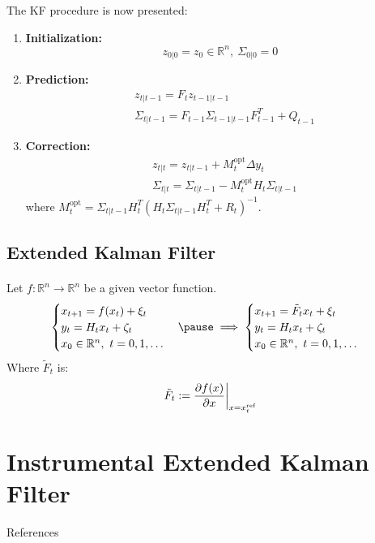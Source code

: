 \documentclass{beamer}
\theoremstyle{definition}
\theoremstyle{remark}
\theoremstyle{example}
\newif\ifinsection
\newif\ifinsubsection
\let\oldsection\section
\renewcommand{\section}{%
  \global\insectiontrue%
  \global\insubsectionfalse%
  \oldsection}
\let\oldsubsection\subsection
\renewcommand{\subsection}{%
  \global\insubsectiontrue%
  \oldsubsection}
\newcommand {\aframe}[1] {%
  \begin{frame}
    \ifinsection\frametitle{\secname}\fi
    \ifinsubsection\framesubtitle{\subsecname}\fi
  #1
  \end{frame}
}
\begin{document}
\aframe{
The KF procedure is now presented:
\begin{enumerate}
  \item \textbf{Initialization: }
  \[
  z_{0|0}=z_0\in \mathbb{R}^n, \ \Sigma_{0|0}=0
  \]
  \item \textbf{Prediction: }
  \[
  \begin{split}
    &z_{t|t-1}=F_tz_{t-1|t-1}\\
    &\Sigma_{t|t-1}=F_{t-1}\Sigma_{t-1|t-1}F_{t-1}^T+Q_{t-1}
  \end{split}
  \]
  \item \textbf{Correction: }
  \[
  \begin{split}
    &z_{t | t}=z_{t | t-1}+M_{t}^{\text{opt}} \Delta y_{t} \\
    &\Sigma_{t | t}=\Sigma_{t | t-1}-M_{t}^{\text{opt}} H_{t} \Sigma_{t | t-1}
  \end{split}
  \]
  where ${M_{t}^{\text {opt}}=\Sigma_{t | t-1} H_{t}^{T}\left(H_{t} \Sigma_{t | t-1} H_{t}^{T}+R_{t}\right)^{-1}}$.
\end{enumerate}
}

\subsection{Extended Kalman Filter}
\aframe{
  Let $f:\mathbb{R}^n \rightarrow \mathbb{R}^n$ be a given vector function.
\begin{equation}
  \begin{cases}
    x_{t+1}=f(x_t) + \xi_t&\\
    y_t=H_tx_t+\zeta_t&\\
    x_0\in \mathbb{R}^n, \ t=0,1,\ldots &
  \end{cases}
  \pause \implies
  \begin{cases}
    x_{t+1}=\tilde{F}_tx_t + \xi_t&\\
    y_t=H_tx_t+\zeta_t &\\
    x_0\in \mathbb{R}^n, \ t=0,1,\ldots &
  \end{cases}
\end{equation}
Where $\tilde{F}_t$ is:
\[
\tilde{F}_t:=\dfrac{\partial f(x)}{\partial x}\bigg|_{x=x^{{\rm ref}}_t}
\]
}

\section{Instrumental Extended Kalman Filter}
\begin{frame}[allowframebreaks]{References}
  \printbibliography
\end{frame}
\end{document}
